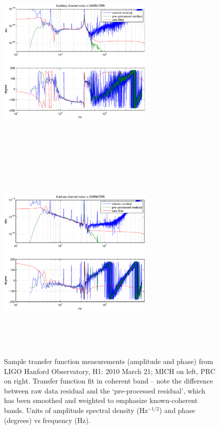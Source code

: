 \begin{figure}
\begin{center}
\includegraphics[height=100mm, width=75mm]{figure3a.eps}
\includegraphics[height=100mm, width=75mm]{figure3b.eps}
\caption{Sample transfer function measurements (amplitude and phase) from LIGO Hanford Observatory, H1: 2010 March 21; MICH on left, PRC on right. Transfer function fit in coherent band -- note the difference between raw data residual and the `pre-processed residual', which has been smoothed and weighted to emphasize known-coherent bands. Units of amplitude spectral density (Hz$^{-1/2}$) and phase (degrees) vs frequency (Hz).}
\label{tfGraph}
\end{center}
\end{figure}
